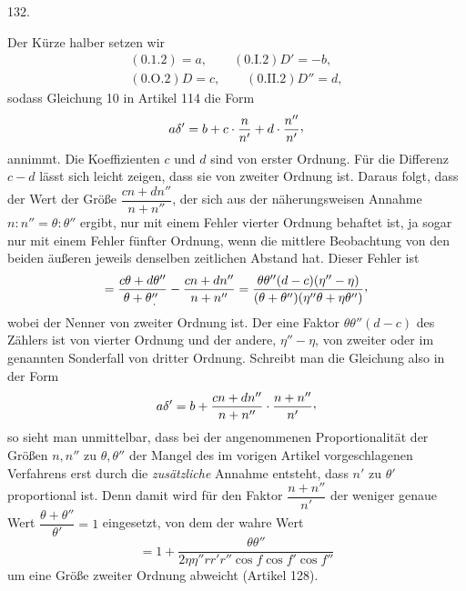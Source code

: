 \par{}\medskip
\begin{center}\hypertarget{native-179}{}\hypertarget{native-179-article132}{}132.\end{center}
Der Kürze halber setzen wir
\[
\begin{gathered}
(0.1.2)=a,\qquad (0.\mathrm{I}.2)D'=-b,\\
(0.\mathrm{O}.2)D=c,\qquad (0.\mathrm{II}.2)D''=d,
\end{gathered}
\]
sodass Gleichung 10 in Artikel 114 die Form
\[
a\delta'=b+c\cdot\frac{n}{n'}+d\cdot\frac{n''}{n'}\mathpunct{\raisebox{.45ex}{,}}
\]
annimmt. Die Koeffizienten $c$ und $d$ sind von erster Ordnung. Für die Differenz $c-d$ lässt sich
leicht zeigen, dass sie von zweiter Ordnung ist. Daraus folgt, dass der Wert der Größe $\dfrac{cn+dn''}{n+n''}$, der sich
aus der näherungsweisen Annahme $n:n''=\theta:\theta''$ ergibt, nur mit einem Fehler vierter Ordnung behaftet ist, ja
sogar nur mit einem Fehler fünfter Ordnung, wenn die mittlere Beobachtung von den beiden äußeren
jeweils denselben zeitlichen Abstand hat. Dieser Fehler ist
\[
=\frac{c\theta+d\theta''}{\theta+\theta''\mathpunct{\mkern-8mu\raisebox{-.65ex}{.}\mkern8mu}}
-\frac{cn+dn''}{n+n''}
=\frac{\theta\theta''(d-c)(\eta''-\eta)}{(\theta+\theta'')(\eta''\theta+\eta\theta'')}\mathpunct{\raisebox{.45ex}{,}}
\]
wobei der Nenner von zweiter Ordnung ist. Der eine Faktor $\theta\theta''(d-c)$ des Zählers ist von vierter Ordnung
und der andere, $\eta''-\eta$, von zweiter oder im genannten Sonderfall von dritter Ordnung. Schreibt man die
Gleichung also in der Form
\[
a\delta'=b+\frac{cn+dn''}{n+n''}\cdot\frac{n+n''}{n'}\mathpunct{\raisebox{.45ex}{,}}
\]
so sieht man unmittelbar, dass bei der angenommenen Proportionalität der Größen $n,n''$ zu $\theta,\theta''$
der Mangel des im vorigen Artikel vorgeschlagenen Verfahrens erst durch die \textit{zusätzliche} Annahme entsteht,
dass $n'$ zu $\theta'$ proportional ist. Denn damit wird für den
Faktor $\dfrac{n+n''}{n'}$ der weniger genaue Wert $\dfrac{\theta+\theta''}{\theta'}=1$ eingesetzt, von dem der wahre Wert
\[
=1+\frac{\theta\theta''}{2\eta\eta''rr'r''\cos f\cos f'\cos f''}
\]
um eine Größe zweiter Ordnung abweicht (Artikel 128).
